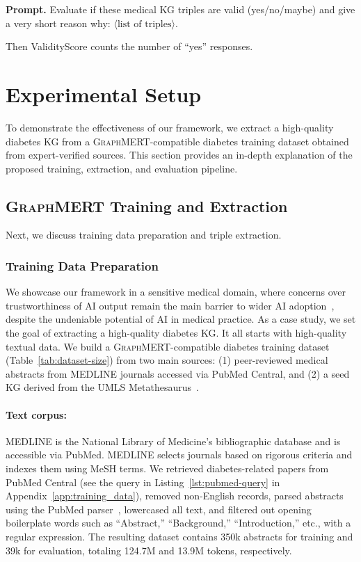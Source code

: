 \documentclass[10pt]{article}
\newcommand{\ours}{\textsc{GraphMERT}\xspace}
\begin{document}
\begin{tcolorbox}[enhanced,breakable,colback=gray!5,colframe=gray!40,
                  left=6pt,right=6pt,top=6pt,bottom=6pt,boxsep=0pt]
\noindent\textbf{Prompt.} Evaluate if these medical KG triples are valid (yes/no/maybe) and give a very short reason why: $\langle\text{list of triples}\rangle$.
\end{tcolorbox}
Then ValidityScore counts the number of ``yes'' responses.

\section{Experimental Setup}
\label{sec:experimental_setup}

 To demonstrate the effectiveness of our framework, we extract a high-quality diabetes KG from a \ours-compatible diabetes training dataset obtained from expert-verified sources.
This section provides an in-depth explanation of the proposed training, extraction, and evaluation pipeline.

\subsection{\ours Training and Extraction}
\label{subsec:glm_training_and_extraction}
Next, we discuss training data preparation and triple extraction.

\subsubsection{Training Data Preparation}
\label{subsubsec:training_data_preparation}
We showcase our framework in a sensitive medical domain, where concerns over trustworthiness of AI output remain the main barrier to wider AI adoption~\cite{wang2025safetychallengesaimedicine, mishra-etal-2024-synfac}, despite the undeniable potential of AI in medical practice. As a case study, we set the goal of extracting a high-quality diabetes KG. It all starts with high-quality textual data. We build a \ours-compatible diabetes training dataset (Table~\ref{tab:dataset-size}) from two main sources: (1) peer-reviewed medical abstracts from MEDLINE journals accessed via PubMed Central, and (2) a seed KG derived from the UMLS Metathesaurus~\cite{UMLS}.

\paragraph{Text corpus:} 
MEDLINE is the National Library of Medicine’s bibliographic database and is accessible via PubMed. MEDLINE selects journals based on rigorous criteria and indexes them using MeSH terms. We retrieved diabetes-related papers from PubMed Central (see the query in Listing~\ref{lst:pubmed-query} in Appendix~\ref{app:training_data}), removed non-English records, parsed abstracts using the PubMed parser~\cite{Achakulvisut2020}, lowercased all text, and filtered out opening boilerplate words such as “Abstract,” “Background,” “Introduction,” etc., with a regular expression. The resulting dataset contains 350k abstracts for training and 39k for evaluation, totaling 124.7M and 13.9M tokens, respectively.
\end{document}
